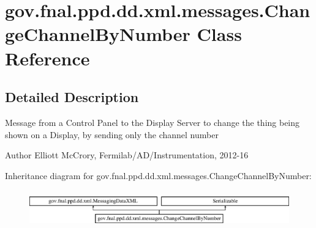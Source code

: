 \hypertarget{classgov_1_1fnal_1_1ppd_1_1dd_1_1xml_1_1messages_1_1ChangeChannelByNumber}{\section{gov.\-fnal.\-ppd.\-dd.\-xml.\-messages.\-Change\-Channel\-By\-Number Class Reference}
\label{classgov_1_1fnal_1_1ppd_1_1dd_1_1xml_1_1messages_1_1ChangeChannelByNumber}
}


\subsection{Detailed Description}
Message from a Control Panel to the Display Server to change the thing being shown on a Display, by sending only the channel number

\begin{DoxyAuthor}{Author}
Elliott Mc\-Crory, Fermilab/\-A\-D/\-Instrumentation, 2012-\/16 
\end{DoxyAuthor}
Inheritance diagram for gov.\-fnal.\-ppd.\-dd.\-xml.\-messages.\-Change\-Channel\-By\-Number\-:\begin{figure}[H]
\begin{center}
\leavevmode
\includegraphics[height=1.627907cm]{classgov_1_1fnal_1_1ppd_1_1dd_1_1xml_1_1messages_1_1ChangeChannelByNumber}
\end{center}
\end{figure}

